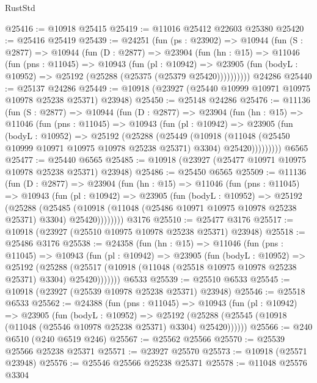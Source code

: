 \begin{lexlean}{RustStd}
\begin{coremodule}
{{{{{{{{{{{{{{{{{{{@25416 := @10918 @25415
@25419 := @11016 @25412 @22603 @25380
@25420 := @25416 @25419
@25439 := @24251
    (fun (ps : @23902) =>
    @10944
      (fun (S : @2877) =>
      @10944
        (fun (D : @2877) =>
        @23904
          (fun (hn : @15) =>
          @11046
            (fun (pns : @11045) =>
            @10943
              (fun (pl : @10942) =>
              @23905 (fun (bodyL : @10952) => @25192 (@25288 (@25375 (@25379 @25420))))))))))
    @24286
@25440 := @25137 @24286
@25449 := @10918 (@23927 (@25440 @10999 @10971 @10975 @10978 @25238 @25371) @23948)
@25450 := @25148 @24286
@25476 := @11136
    (fun (S : @2877) =>
    @10944
      (fun (D : @2877) =>
      @23904
        (fun (hn : @15) =>
        @11046
          (fun (pns : @11045) =>
          @10943
            (fun (pl : @10942) =>
            @23905
              (fun (bodyL : @10952) =>
              @25192
                (@25288
                  (@25449
                    (@10918
                      (@11048 (@25450 @10999 @10971 @10975 @10978 @25238 @25371) @3304)
                      @25420)))))))))
    @6565
@25477 := @25440 @6565
@25485 := @10918 (@23927 (@25477 @10971 @10975 @10978 @25238 @25371) @23948)
@25486 := @25450 @6565
@25509 := @11136
    (fun (D : @2877) =>
    @23904
      (fun (hn : @15) =>
      @11046
        (fun (pns : @11045) =>
        @10943
          (fun (pl : @10942) =>
          @23905
            (fun (bodyL : @10952) =>
            @25192
              (@25288
                (@25485
                  (@10918 (@11048 (@25486 @10971 @10975 @10978 @25238 @25371) @3304) @25420))))))))
    @3176
@25510 := @25477 @3176
@25517 := @10918 (@23927 (@25510 @10975 @10978 @25238 @25371) @23948)
@25518 := @25486 @3176
@25538 := @24358
    (fun (hn : @15) =>
    @11046
      (fun (pns : @11045) =>
      @10943
        (fun (pl : @10942) =>
        @23905
          (fun (bodyL : @10952) =>
          @25192
            (@25288
              (@25517 (@10918 (@11048 (@25518 @10975 @10978 @25238 @25371) @3304) @25420)))))))
    @6533
@25539 := @25510 @6533
@25545 := @10918 (@23927 (@25539 @10978 @25238 @25371) @23948)
@25546 := @25518 @6533
@25562 := @24388
    (fun (pns : @11045) =>
    @10943
      (fun (pl : @10942) =>
      @23905
        (fun (bodyL : @10952) =>
        @25192 (@25288 (@25545 (@10918 (@11048 (@25546 @10978 @25238 @25371) @3304) @25420))))))
@25566 := @240 @6510 (@240 @6519 @246)
@25567 := @25562 @25566
@25570 := @25539 @25566 @25238 @25371
@25571 := @23927 @25570
@25573 := @10918 (@25571 @23948)
@25576 := @25546 @25566 @25238 @25371
@25578 := @11048 @25576 @3304
}}}}}}}}}}}}}}}}}}}
\end{coremodule}
\end{lexlean}
